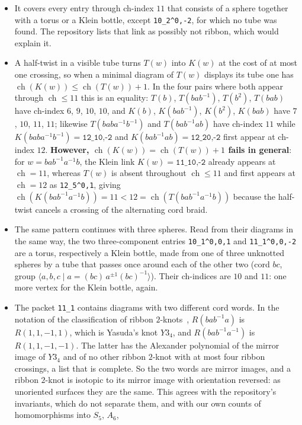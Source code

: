 \documentclass[11pt]{amsart}
\newcommand{\ch}{\operatorname{ch}}
\newcommand{\lab}[1]{\texttt{#1}}
\newcommand{\inv}{^{-1}}
\theoremstyle{plain}
\theoremstyle{remark}
\begin{document}
\begin{itemize}[leftmargin=*]
\item It covers every entry through ch-index $11$ that consists of a sphere together with a torus or a
Klein bottle, except \lab{10\_2\^{}0,-2}, for which no tube was found. The repository lists that link as
possibly not ribbon, which would explain it.
\item A half-twist in a visible tube turns $T(w)$ into $K(w)$ at the cost of at most one crossing, so when a
minimal diagram of $T(w)$ displays its tube one has $\ch(K(w))\le\ch(T(w))+1$. In the four pairs where both
appear through $\ch\le 11$ this is an equality:
$T(b)$, $T(bab\inv)$, $T(b^2)$, $T(bab)$ have ch-index $6$, $9$, $10$, $10$, and
$K(b)$, $K(bab\inv)$, $K(b^2)$, $K(bab)$ have $7$, $10$, $11$, $11$; likewise $T(baba\inv b\inv)$ and
$T(bab\inv ab)$ have ch-index $11$ while $K(baba\inv b\inv)=\lab{12\_1\^{}0,-2}$ and
$K(bab\inv ab)=\lab{12\_2\^{}0,-2}$ first appear at ch-index $12$. \textbf{However, $\ch(K(w))=\ch(T(w))+1$
fails in general}: for $w=bab\inv a\inv b$, the Klein link $K(w)=\lab{11\_1\^{}0,-2}$ already appears at
$\ch=11$, whereas $T(w)$ is absent throughout $\ch\le 11$ and first appears at $\ch=12$ as \lab{12\_5\^{}0,1},
giving $\ch(K(bab\inv a\inv b))=11<12=\ch(T(bab\inv a\inv b))$ because the half-twist cancels a crossing of
the alternating cord braid.
\item The same pattern continues with three spheres. Read from their diagrams in the same way, the two
three-component entries \lab{10\_1\^{}0,0,1} and \lab{11\_1\^{}0,0,-2} are a torus, respectively a
Klein bottle, made from one of three unknotted spheres by a tube that passes once around each of the other
two (cord $bc$, group $\langle a,b,c\mid a=(bc)\,a^{\pm1}(bc)\inv\rangle$). Their ch-indices are $10$
and $11$: one more vertex for the Klein bottle, again.
\item The packet \lab{11\_1} contains diagrams with two different cord words. In the notation of the
classification of ribbon $2$-knots~\cite{Kan,KT}, $R(bab\inv a)$ is $R(1,1,-1,1)$, which is Yasuda's knot
$Y3_4$, and $R(bab\inv a\inv)$ is $R(1,1,-1,-1)$. The latter has the Alexander polynomial of the mirror
image of $Y3_4$ and of no other ribbon $2$-knot with at most four ribbon crossings, a list that is
complete. So the two words are mirror images, and a ribbon $2$-knot is isotopic to its mirror image with
orientation reversed: as unoriented surfaces they are the same. This agrees with the repository's
invariants, which do not separate them, and with our own counts of homomorphisms into $S_5$, $A_6$,

\end{itemize}
\end{document}
